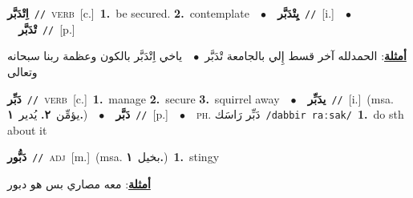 \documentclass[10pt,a4paper,twoside]{article} %
\begin{document}
\begin{multicols}{2}
{{\setlength\topsep{0pt}\textbf{\foreignlanguage{arabic}{اِتْدَبَّر}}\ {\color{gray}\texttt{//}\color{black}}\ \textsc{verb}\ [c.]\ \textbf{1.}~be secured.  \textbf{2.}~contemplate\ \ $\bullet$\ \ \setlength\topsep{0pt}\textbf{\foreignlanguage{arabic}{يِتْدَبَّر}}\ {\color{gray}\texttt{//}\color{black}}\ [i.]\ \ $\bullet$\ \ \setlength\topsep{0pt}\textbf{\foreignlanguage{arabic}{تْدَبَّر}}\ {\color{gray}\texttt{//}\color{black}}\ [p.]\  \begin{flushright}\color{gray}\foreignlanguage{arabic}{\textbf{\underline{\foreignlanguage{arabic}{أمثلة}}}: الحمدلله آخر قسط إِلي بالجامعة تْدَبَّر\ $\bullet$\ \  ياخي اِتْدَبَّر بالكون وعظمة ربنا سبحانه وتعالى}\end{flushright}\color{black}} \vspace{2mm}

{\setlength\topsep{0pt}\textbf{\foreignlanguage{arabic}{دَبِّر}}\ {\color{gray}\texttt{//}\color{black}}\ \textsc{verb}\ [c.]\ \textbf{1.}~manage  \textbf{2.}~secure  \textbf{3.}~squirrel away\ \ $\bullet$\ \ \setlength\topsep{0pt}\textbf{\foreignlanguage{arabic}{يدَبِّر}}\ {\color{gray}\texttt{//}\color{black}}\ [i.]\ \color{gray}(msa. \foreignlanguage{arabic}{يؤمِّن}~\foreignlanguage{arabic}{\textbf{٢.}}  \foreignlanguage{arabic}{يُدير}~\foreignlanguage{arabic}{\textbf{١.}})\color{black}\ \ $\bullet$\ \ \setlength\topsep{0pt}\textbf{\foreignlanguage{arabic}{دَبَّر}}\ {\color{gray}\texttt{//}\color{black}}\ [p.]\ \ $\bullet$\ \ \textsc{ph.} \color{gray} \foreignlanguage{arabic}{دَبِّر رَاسَك}\color{black}\ {\color{gray}\texttt{/{\sffamily dabbir raːsak}/}\color{black}}\ \textbf{1.}~do sth about it\ 

{\setlength\topsep{0pt}\textbf{\foreignlanguage{arabic}{دَبُّور}}\ {\color{gray}\texttt{//}\color{black}}\ \textsc{adj}\ [m.]\ \color{gray}(msa. \foreignlanguage{arabic}{بخيل}~\foreignlanguage{arabic}{\textbf{١.}})\color{black}\ \textbf{1.}~stingy\  \begin{flushright}\color{gray}\foreignlanguage{arabic}{\textbf{\underline{\foreignlanguage{arabic}{أمثلة}}}: معه مصاري بس هو دبور}\end{flushright}\color{black}} \vspace{2mm}

}}
\end{multicols}
\end{document}
